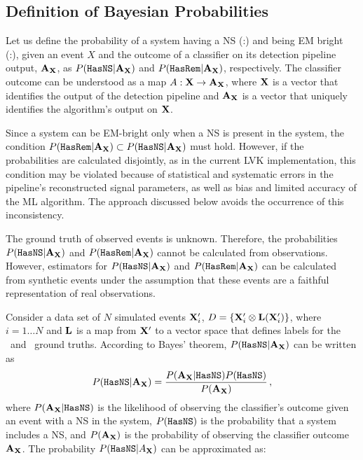 \subsection{Definition of Bayesian Probabilities} \label{bayesian_probs}

Let us define the probability of a system having a \ac{NS} (\hasns:\true) and being \ac{EM} bright (\hasrem:\true), given an event $X$ and the outcome of a classifier on its detection pipeline
output, ${\bf A}_{\bf X}$, as $P({{\tt HasNS}}|{\bf A}_{\bf X})$ and $P({{\tt HasRem}}|{\bf A}_{\bf X})$, respectively. The classifier outcome can be understood as a map $A:{\bf X}\to {\bf A}_{\bf X}$, where
$\bf X$ is a vector that identifies the output of the detection pipeline and ${\bf A}_{\bf X}$ is a vector that uniquely identifies the algorithm's output on $\bf X$. 

Since a system can be EM-bright only when a \ac{NS} is present in the system, the condition $P({{\tt HasRem}}|{\bf A}_{\bf X})\subset P({{\tt HasNS}}|{\bf A}_{\bf X})$ must hold. However, if the probabilities
are calculated disjointly, as in the current \ac{LVK} implementation, this condition may be violated because of statistical and systematic errors in the pipeline's reconstructed signal
parameters, as well as bias and limited accuracy of the \ac{ML} algorithm. The approach discussed below avoids the occurrence of this inconsistency.

The ground truth of observed events is unknown. Therefore, the probabilities $P({{\tt HasNS}}|{\bf A}_{\bf X})$ and $P({{\tt HasRem}}|{\bf A}_{\bf X})$ cannot be calculated from observations. However,
estimators for $P({{\tt HasNS}}|{\bf A}_{\bf X})$ and $P({{\tt HasRem}}|{\bf A}_{\bf X})$ can be calculated from synthetic events under the assumption that these events are a faithful representation of
real observations.

Consider a data set of $N$ simulated events ${\bf X}'_i$, $D=\{{\bf X}'_i\otimes{\bf L}({\bf X}'_i)\}$, where $i=1\dots N$ and ${\bf L}$ is a map from ${\bf X}'$ to a vector space
that defines labels for the \hasns\ and \hasrem\ ground truths. According to Bayes' theorem, $P({{\tt HasNS}}|{\bf A}_{\bf X})$  can be written as 
%
\begin{equation}
P({{\tt HasNS}}|{\bf A}_{\bf X})=\frac{P({\bf A}_{\bf X}|{{\tt HasNS}})P({{\tt HasNS}})}{P({\bf A}_{\bf X})}\,,
\label{bayes}
\end{equation}
%
where $P({\bf A}_{\bf X}|{{\tt HasNS}})$ is the likelihood of observing the classifier's outcome given an event with a \ac{NS} in the system, $P({{\tt HasNS}})$ is the probability that a system includes a \ac{NS}, and $P({\bf A}_{\bf X})$ is the probability of observing the classifier outcome ${\bf A}_{\bf X}$. The probability $P({{\tt HasNS}}|A_{\bf X})$ can be approximated as:  
%

